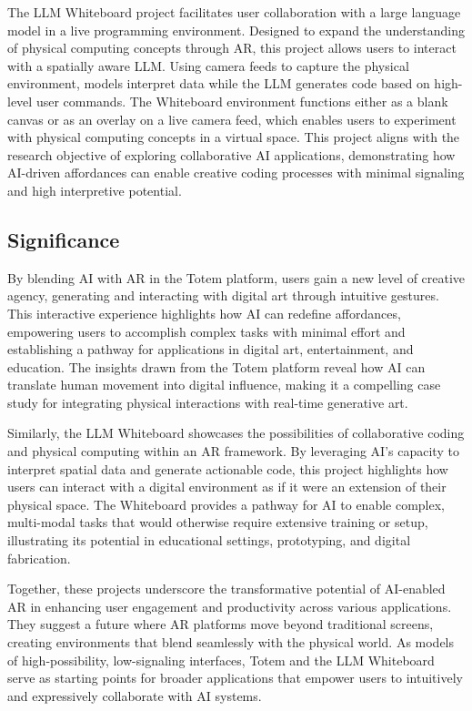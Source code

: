 The LLM Whiteboard project facilitates user collaboration with a large language model in a live programming environment.
Designed to expand the understanding of physical computing concepts through AR, this project allows users to interact with a spatially aware LLM.
Using camera feeds to capture the physical environment, models interpret data while the LLM generates code based on high-level user commands.
The Whiteboard environment functions either as a blank canvas or as an overlay on a live camera feed, which enables users to experiment with physical computing concepts in a virtual space. 
This project aligns with the research objective of exploring collaborative AI applications, demonstrating how AI-driven affordances can enable creative coding processes with minimal signaling and high interpretive potential.

\subsection{Significance}

By blending AI with AR in the Totem platform, users gain a new level of creative agency, generating and interacting with digital art through intuitive gestures.
This interactive experience highlights how AI can redefine affordances, empowering users to accomplish complex tasks with minimal effort and establishing a pathway for applications in digital art, entertainment, and education. The insights drawn from the Totem platform reveal how AI can translate human movement into digital influence, making it a compelling case study for integrating physical interactions with real-time generative art.

Similarly, the LLM Whiteboard showcases the possibilities of collaborative coding and physical computing within an AR framework.
By leveraging AI's capacity to interpret spatial data and generate actionable code, this project highlights how users can interact with a digital environment as if it were an extension of their physical space.
The Whiteboard provides a pathway for AI to enable complex, multi-modal tasks that would otherwise require extensive training or setup, illustrating its potential in educational settings, prototyping, and digital fabrication.

Together, these projects underscore the transformative potential of AI-enabled AR in enhancing user engagement and productivity across various applications.
They suggest a future where AR platforms move beyond traditional screens, creating environments that blend seamlessly with the physical world.
As models of high-possibility, low-signaling interfaces, Totem and the LLM Whiteboard serve as starting points for broader applications that empower users to intuitively and expressively collaborate with AI systems.